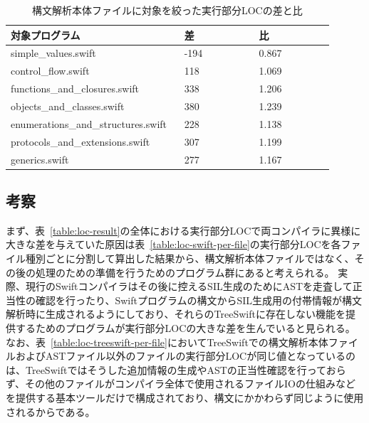 \begin{table}[!hbtp]
    \begin{center}
        \caption{構文解析本体ファイルに対象を絞った実行部分LOCの差と比}
        \begin{tabular}{|p{0.45\linewidth}|p{0.225\linewidth}|p{0.225\linewidth}|}
            \hline
            対象プログラム & 差 & 比\\
            \hline
            \hline
            simple\_values.swift & -194 & 0.867\\
            \hline
            control\_flow.swift & 118 & 1.069\\
            \hline
            functions\_and\_closures.swift & 338 & 1.206\\
            \hline
            objects\_and\_classes.swift & 380 & 1.239\\
            \hline
            enumerations\_and\_structures.swift & 228 & 1.138\\
            \hline
            protocols\_and\_extensions.swift & 307 & 1.199\\
            \hline
            generics.swift & 277 & 1.167\\
            \hline
        \end{tabular}
        \label{table:parse-loc-arith}
    \end{center}
\end{table}

\subsection{考察}

まず、表~\ref{table:loc-result}の全体における実行部分LOCで両コンパイラに異様に大きな差を与えていた原因は表~\ref{table:loc-swift-per-file}の実行部分LOCを各ファイル種別ごとに分割して算出した結果から、構文解析本体ファイルではなく、その後の処理のための準備を行うためのプログラム群にあると考えられる。
実際、現行のSwiftコンパイラはその後に控えるSIL生成のためにASTを走査して正当性の確認を行ったり、Swiftプログラムの構文からSIL生成用の付帯情報が構文解析時に生成されるようにしており、それらのTreeSwiftに存在しない機能を提供するためのプログラムが実行部分LOCの大きな差を生んでいると見られる。
なお、表~\ref{table:loc-treeswift-per-file}においてTreeSwiftでの構文解析本体ファイルおよびASTファイル以外のファイルの実行部分LOCが同じ値となっているのは、TreeSwiftではそうした追加情報の生成やASTの正当性確認を行っておらず、その他のファイルがコンパイラ全体で使用されるファイルIOの仕組みなどを提供する基本ツールだけで構成されており、構文にかかわらず同じように使用されるからである。



